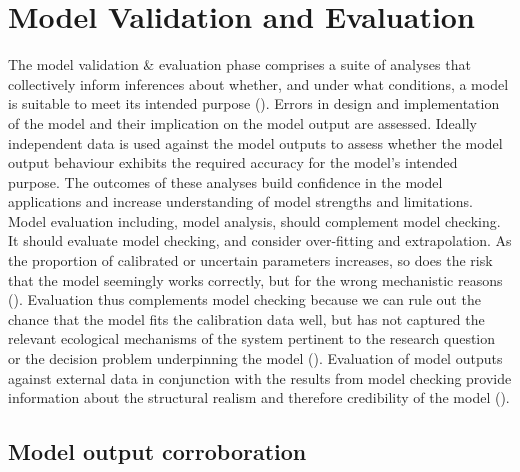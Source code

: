\documentclass[
]{article}
\begin{document}
\section{Model Validation and
Evaluation}\label{model-validation-and-evaluation}

\begin{tcolorbox}[enhanced jigsaw, opacitybacktitle=0.6, bottomrule=.15mm, leftrule=.75mm, rightrule=.15mm, colbacktitle=quarto-callout-note-color!10!white, toprule=.15mm, titlerule=0mm, left=2mm, colframe=quarto-callout-note-color-frame, breakable, title=\textcolor{quarto-callout-note-color}{\faInfo}\hspace{0.5em}{Explanation}, opacityback=0, coltitle=black, bottomtitle=1mm, colback=white, toptitle=1mm, arc=.35mm]

The model validation \& evaluation phase comprises a suite of analyses
that collectively inform inferences about whether, and under what
conditions, a model is suitable to meet its intended purpose
(). Errors in
design and implementation of the model and their implication on the
model output are assessed. Ideally independent data is used against the
model outputs to assess whether the model output behaviour exhibits the
required accuracy for the model's intended purpose. The outcomes of
these analyses build confidence in the model applications and increase
understanding of model strengths and limitations. Model evaluation
including, model analysis, should complement model checking. It should
evaluate model checking, and consider over-fitting and extrapolation. As
the proportion of calibrated or uncertain parameters increases, so does
the risk that the model seemingly works correctly, but for the wrong
mechanistic reasons ().
Evaluation thus complements model checking because we can rule out the
chance that the model fits the calibration data well, but has not
captured the relevant ecological mechanisms of the system pertinent to
the research question or the decision problem underpinning the model
(). Evaluation of model
outputs against external data in conjunction with the results from model
checking provide information about the structural realism and therefore
credibility of the model ().

\end{tcolorbox}

\subsection{Model output
corroboration}\label{model-output-corroboration}
\end{document}
